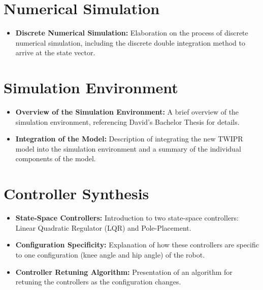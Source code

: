 \section{Numerical Simulation}
\begin{itemize}
	\item \textbf{Discrete Numerical Simulation:} Elaboration on the process of discrete numerical simulation, including the discrete double integration method to arrive at the state vector.
\end{itemize}

\section{Simulation Environment}
\begin{itemize}
	\item \textbf{Overview of the Simulation Environment:} A brief overview of the simulation environment, referencing David's Bachelor Thesis for details.
	
	
	\item \textbf{Integration of the Model:} Description of integrating the new TWIPR model into the simulation environment and a summary of the individual components of the model.
\end{itemize}

\section{Controller Synthesis}
\begin{itemize}
	\item \textbf{State-Space Controllers:} Introduction to two state-space controllers: Linear Quadratic Regulator (LQR) and Pole-Placement.
	\item \textbf{Configuration Specificity:} Explanation of how these controllers are specific to one configuration (knee angle and hip angle) of the robot.
	\item \textbf{Controller Retuning Algorithm:} Presentation of an algorithm for retuning the controllers as the configuration changes.
\end{itemize}


